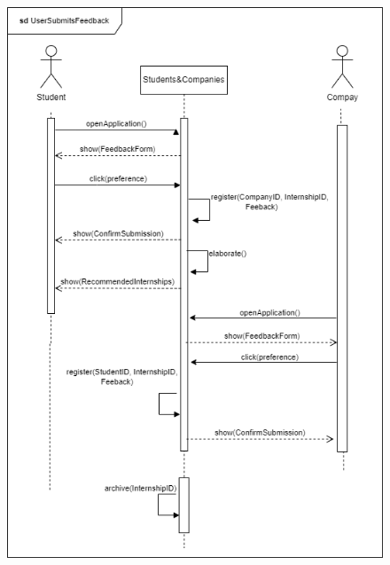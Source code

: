 \documentclass{article}
\begin{document}
\begin{figure}[H]
    \centering
    \includegraphics[scale = 0.45]{figures/UseCasesSD/UserSubmitsFeedbackSD.drawio.png}
\end{figure}
\newpage
\end{document}
